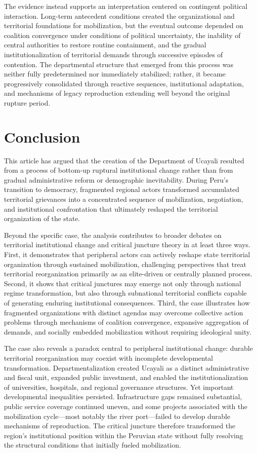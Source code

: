 \documentclass[12pt]{article}
\begin{document}
The evidence instead supports an interpretation centered on contingent political interaction. Long-term antecedent conditions created the organizational and territorial foundations for mobilization, but the eventual outcome depended on coalition convergence under conditions of political uncertainty, the inability of central authorities to restore routine containment, and the gradual institutionalization of territorial demands through successive episodes of contention. The departmental structure that emerged from this process was neither fully predetermined nor immediately stabilized; rather, it became progressively consolidated through reactive sequences, institutional adaptation, and mechanisms of legacy reproduction extending well beyond the original rupture period.

\section{Conclusion}

This article has argued that the creation of the Department of Ucayali resulted from a process of bottom-up ruptural institutional change rather than from gradual administrative reform or demographic inevitability. During Peru's transition to democracy, fragmented regional actors transformed accumulated territorial grievances into a concentrated sequence of mobilization, negotiation, and institutional confrontation that ultimately reshaped the territorial organization of the state.

Beyond the specific case, the analysis contributes to broader debates on territorial institutional change and critical juncture theory in at least three ways. First, it demonstrates that peripheral actors can actively reshape state territorial organization through sustained mobilization, challenging perspectives that treat territorial reorganization primarily as an elite-driven or centrally planned process. Second, it shows that critical junctures may emerge not only through national regime transformation, but also through subnational territorial conflicts capable of generating enduring institutional consequences. Third, the case illustrates how fragmented organizations with distinct agendas may overcome collective action problems through mechanisms of coalition convergence, expansive aggregation of demands, and socially embedded mobilization without requiring ideological unity.

The case also reveals a paradox central to peripheral institutional change: durable territorial reorganization may coexist with incomplete developmental transformation. Departmentalization created Ucayali as a distinct administrative and fiscal unit, expanded public investment, and enabled the institutionalization of universities, hospitals, and regional governance structures. Yet important developmental inequalities persisted. Infrastructure gaps remained substantial, public service coverage continued uneven, and some projects associated with the mobilization cycle---most notably the river port---failed to develop durable mechanisms of reproduction. The critical juncture therefore transformed the region's institutional position within the Peruvian state without fully resolving the structural conditions that initially fueled mobilization.
\end{document}
